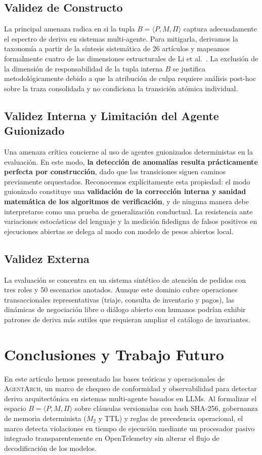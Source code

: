 \documentclass[conference]{IEEEtran}
\begin{document}
\subsection{Validez de Constructo}
La principal amenaza radica en si la tupla $B = \langle P, M, \Pi \rangle$ captura adecuadamente el espectro de deriva en sistemas multi-agente. Para mitigarla, derivamos la taxonom\'ia a partir de la s\'intesis sistem\'atica de 26 art\'iculos y mapeamos formalmente cuatro de las dimensiones estructurales de Li et al.~\cite{li2026}. La exclusi\'on de la dimensi\'on de responsabilidad de la tupla interna $B$ se justifica metodol\'ogicamente debido a que la atribuci\'on de culpa requiere an\'alisis post-hoc sobre la traza consolidada y no condiciona la transici\'on at\'omica individual.

\subsection{Validez Interna y Limitaci\'on del Agente Guionizado}
Una amenaza cr\'itica concierne al uso de agentes guionizados deterministas en la evaluaci\'on. En este modo, \textbf{la detecci\'on de anomal\'ias resulta pr\'acticamente perfecta por construcci\'on}, dado que las transiciones siguen caminos previamente orquestados. Reconocemos expl\'icitamente esta propiedad: el modo guionizado constituye una \textbf{validaci\'on de la correcci\'on interna y sanidad matem\'atica de los algoritmos de verificaci\'on}, y de ninguna manera debe interpretarse como una prueba de generalizaci\'on conductual. La resistencia ante variaciones estoc\'asticas del lenguaje y la medici\'on fidedigna de falsos positivos en ejecuciones abiertas se delega al modo con modelo de pesos abiertos local.

\subsection{Validez Externa}
La evaluaci\'on se concentra en un sistema sint\'etico de atenci\'on de pedidos con tres roles y 50 escenarios anotados. Aunque este dominio cubre operaciones transaccionales representativas (triaje, consulta de inventario y pagos), las din\'amicas de negociaci\'on libre o di\'alogo abierto con humanos podr\'ian exhibir patrones de deriva m\'as sutiles que requieran ampliar el cat\'alogo de invariantes.

\section{Conclusiones y Trabajo Futuro}
En este art\'iculo hemos presentado las bases te\'oricas y operacionales de \textsc{AgentArch}, un marco de chequeo de conformidad y observabilidad para detectar deriva arquitect\'onica en sistemas multi-agente basados en LLMs. Al formalizar el espacio $B = \langle P, M, \Pi \rangle$ sobre cl\'ausulas versionadas con hash SHA-256, gobernanza de memoria determinista ($M_2$ y TTL) y reglas de precedencia operacional, el marco detecta violaciones en tiempo de ejecuci\'on mediante un procesador pasivo integrado transparentemente en OpenTelemetry sin alterar el flujo de decodificaci\'on de los modelos.
\end{document}
